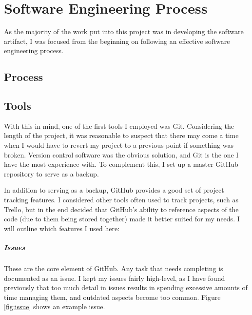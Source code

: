\chapter{Software Engineering Process}

As the majority of the work put into this project was in developing the software artifact, I was focused from the beginning on following an effective software engineering process.

\section{Process}

\section{Tools}
With this in mind, one of the first tools I employed was Git\cite{Git}.
Considering the length of the project, it was reasonable to suspect that there may come a time when I would have to revert my project to a previous point if something was broken.
Version control software was the obvious solution, and Git is the one I have the most experience with. To complement this, I set up a master GitHub\cite{GitHub} repository to serve as a backup.

In addition to serving as a backup, GitHub provides a good set of project tracking features. 
I considered other tools often used to track projects, such as Trello\cite{Trello}, but in the end decided that GitHub's ability to reference aspects of the code (due to them being stored together) made it better suited for my needs. 
I will outline which features I used here:

\paragraph{Issues} These are the core element of GitHub. Any task that needs completing is documented as an issue.
I kept my issues fairly high-level, as I have found previously that too much detail in issues results in spending excessive amounts of time managing them, and outdated aspects become too common. Figure \ref{fig:issue} shows an example issue.


